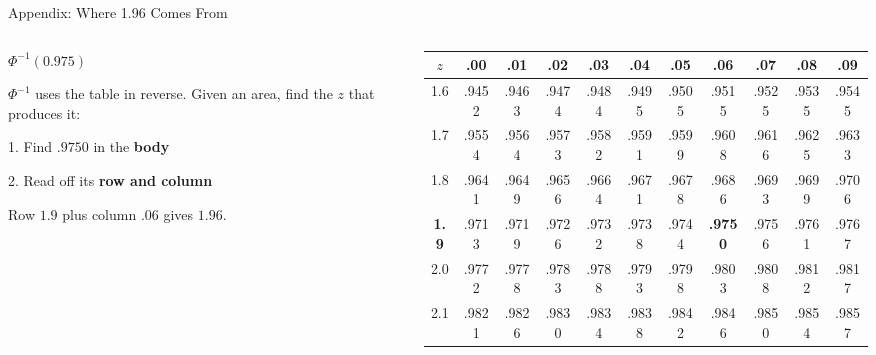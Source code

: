 \documentclass[
  ignorenonframetext,
  aspectratio=169,
]{beamer}
\begin{document}
\begin{frame}{Appendix: Where 1.96 Comes From}
\label{appendix-where-1.96-comes-from}
\begin{columns}[T]

\begin{column}{0.30\textwidth}
\vspace{0.6em}

\begin{center}
$\Phi^{-1}(\mathbf{0.975})$
\end{center}

\vspace{0.5em}

\footnotesize
$\Phi^{-1}$ uses the table in reverse. Given an area, find the $z$ that produces it:

\vspace{0.4em}

\hspace{0.5em}1. Find $.9750$ in the \textbf{body}

\vspace{0.2em}

\hspace{0.5em}2. Read off its \textbf{row and column}

\vspace{0.5em}

Row $1.9$ plus column $.06$ gives $\mathbf{1.96}$.
\end{column}

\begin{column}{0.70\textwidth}
\begin{center}
\scriptsize
\setlength{\tabcolsep}{2.4pt}
\renewcommand{\arraystretch}{1.25}
\begin{tabular}{c|cccccccccc}
\toprule
$z$ & .00 & .01 & .02 & .03 & .04 & .05 & \cellcolor{stataccbg}\textbf{.06} & .07 & .08 & .09 \\
\midrule
1.6 & .9452 & .9463 & .9474 & .9484 & .9495 & .9505 & \cellcolor{stataccbg}.9515 & .9525 & .9535 & .9545 \\
1.7 & .9554 & .9564 & .9573 & .9582 & .9591 & .9599 & \cellcolor{stataccbg}.9608 & .9616 & .9625 & .9633 \\
1.8 & .9641 & .9649 & .9656 & .9664 & .9671 & .9678 & \cellcolor{stataccbg}.9686 & .9693 & .9699 & .9706 \\
\cellcolor{stataccbg}\textbf{1.9} & \cellcolor{stataccbg}.9713 & \cellcolor{stataccbg}.9719 & \cellcolor{stataccbg}.9726 & \cellcolor{stataccbg}.9732 & \cellcolor{stataccbg}.9738 & \cellcolor{stataccbg}.9744 & \cellcolor{statorange}\textbf{\color{white}.9750} & \cellcolor{stataccbg}.9756 & \cellcolor{stataccbg}.9761 & \cellcolor{stataccbg}.9767 \\
2.0 & .9772 & .9778 & .9783 & .9788 & .9793 & .9798 & \cellcolor{stataccbg}.9803 & .9808 & .9812 & .9817 \\
2.1 & .9821 & .9826 & .9830 & .9834 & .9838 & .9842 & \cellcolor{stataccbg}.9846 & .9850 & .9854 & .9857 \\
\bottomrule
\end{tabular}
\end{center}


\end{column}
\end{columns}
\end{frame}
\end{document}
